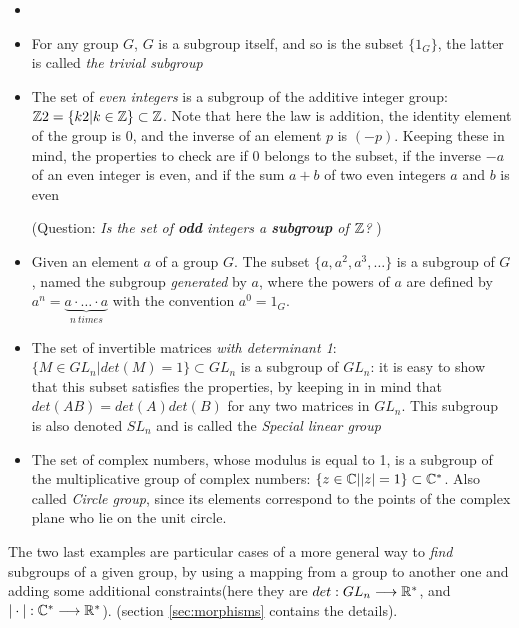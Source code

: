 \begin{example}
    \begin{itemize} \label{ex:subgroups-ex}
        \item[]
 \item For any group $G$, $G$ is a subgroup itself, and so is the subset $\{1_G\}$, the latter is called \textit{the trivial subgroup}
        \item The set of \textit{even integers} is a subgroup of the additive integer group: $\mathbb{Z}2 = \{k2 | k \in \mathbb{Z}\} \subset \mathbb{Z}$.
        Note that here the law is addition, the identity element of the group is $0$, and the inverse of an element $p$ is $(-p)$. Keeping these in mind, the properties to check are if $0$ belongs to the subset, if the inverse $-a$ of an even integer is even, and if the sum $a + b$ of two even integers $a$ and $b$ is even
        
        (Question: \textit{Is the set of \textbf{odd} integers a \textbf{subgroup} of $\mathbb{Z}$?} \label{ex:subgroup-even-int})

    \item Given an element $a$ of a group $G$. The subset $\{
        a, a^2, a^3, \hdots
    \}$ is a subgroup of $G$, named the subgroup \textit{generated} by $a$, where the powers of $a$ are defined by $a^n = \underbrace{a \cdot \hdots \cdot a}_{n\ times}$ with the convention $a^0 = 1_G$.
    \item The set of invertible matrices \textit{with determinant 1}: $\{M \in GL_n | det(M) = 1\} \subset GL_n$ is a subgroup of $GL_n$: it is easy to show that this subset satisfies the properties, by keeping in in mind that $det(AB) = det(A)det(B)$ for any two matrices in $GL_n$. This subgroup is also denoted $SL_n$ and is called the \textit{Special linear group}
    \item The set of complex numbers, whose modulus is equal to 1, is a subgroup of the multiplicative group of complex numbers: $\{z \in \mathbb{C} | |z| = 1\} \subset \mathbb{C}^*$. Also called \textit{Circle group}, since its elements correspond to the points of the complex plane who lie on the unit circle.
    \end{itemize}
\end{example}
The two last examples are particular cases of a more general way to \textit{find} subgroups of a given group, by using a mapping from a group to another one and adding some additional constraints(here they are $det: GL_n \longrightarrow \mathbb{R}^*$, and $|\cdot|: \mathbb{C}^* \longrightarrow \mathbb{R}^*$). (section \ref{sec:morphisms} contains the details).

